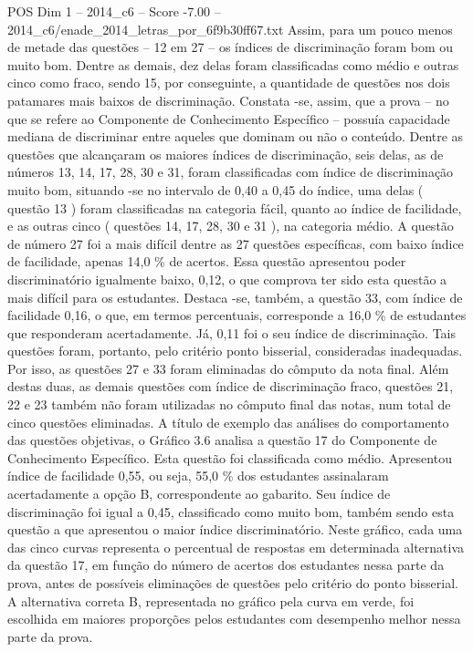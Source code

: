\begin{textsample}{POS Dim 1 – 2014\_c6 – Score -7.00 – 2014\_c6/enade\_2014\_letras\_por\_6f9b30ff67.txt}
Assim, para um pouco menos de metade das questões – 12 em 27 – os índices de discriminação foram bom ou muito bom.
Dentre as demais, dez delas foram classificadas como médio e outras cinco como fraco, sendo 15, por conseguinte, a quantidade de questões nos dois patamares mais baixos de discriminação.
Constata -se, assim, que a prova – no que se refere ao Componente de Conhecimento Específico – possuía capacidade mediana de discriminar entre aqueles que dominam ou não o conteúdo.
Dentre as questões que alcançaram os maiores índices de discriminação, seis delas, as de números 13, 14, 17, 28, 30 e 31, foram classificadas com índice de discriminação muito bom, situando -se no intervalo de 0,40 a 0,45 do índice, uma delas ( questão 13 ) foram classificadas na categoria fácil, quanto ao índice de facilidade, e as outras cinco ( questões 14, 17, 28, 30 e 31 ), na categoria médio.
A questão de número 27 foi a mais difícil dentre as 27 questões específicas, com baixo índice de facilidade, apenas 14,0 \% de acertos.
Essa questão apresentou poder discriminatório igualmente baixo, 0,12, o que comprova ter sido esta questão a mais difícil para os estudantes.
Destaca -se, também, a questão 33, com índice de facilidade 0,16, o que, em termos percentuais, corresponde a 16,0 \% de estudantes que responderam acertadamente.
Já, 0,11 foi o seu índice de discriminação.
Tais questões foram, portanto, pelo critério ponto bisserial, consideradas inadequadas.
Por isso, as questões 27 e 33 foram eliminadas do cômputo da nota final.
Além destas duas, as demais questões com índice de discriminação fraco, questões 21, 22 e 23 também não foram utilizadas no cômputo final das notas, num total de cinco questões eliminadas.
A título de exemplo das análises do comportamento das questões objetivas, o Gráfico 3.6 analisa a questão 17 do Componente de Conhecimento Específico.
Esta questão foi classificada como médio.
Apresentou índice de facilidade 0,55, ou seja, 55,0 \% dos estudantes assinalaram acertadamente a opção B, correspondente ao gabarito.
Seu índice de discriminação foi igual a 0,45, classificado como muito bom, também sendo esta questão a que apresentou o maior índice discriminatório.
Neste gráfico, cada uma das cinco curvas representa o percentual de respostas em determinada alternativa da questão 17, em função do número de acertos dos estudantes nessa parte da prova, antes de possíveis eliminações de questões pelo critério do ponto bisserial.
A alternativa correta B, representada no gráfico pela curva em verde, foi escolhida em maiores proporções pelos estudantes com desempenho melhor nessa parte da prova.

\end{textsample}
